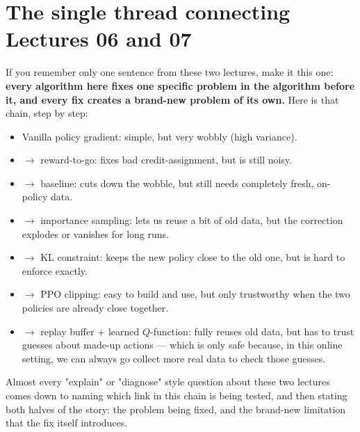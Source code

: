 \documentclass[11pt]{article}
\begin{document}
\section{The single thread connecting Lectures 06 and 07}

If you remember only one sentence from these two lectures, make it this one: \textbf{every algorithm here fixes one specific problem in the algorithm before it, and every fix creates a brand-new problem of its own.} Here is that chain, step by step:
\begin{itemize}[leftmargin=*]
  \item Vanilla policy gradient: simple, but very wobbly (high variance).
  \item $\to$ reward-to-go: fixes bad credit-assignment, but is still noisy.
  \item $\to$ baseline: cuts down the wobble, but still needs completely fresh, on-policy data.
  \item $\to$ importance sampling: lets us reuse a bit of old data, but the correction explodes or vanishes for long runs.
  \item $\to$ KL constraint: keeps the new policy close to the old one, but is hard to enforce exactly.
  \item $\to$ PPO clipping: easy to build and use, but only trustworthy when the two policies are already close together.
  \item $\to$ replay buffer $+$ learned $Q$-function: fully reuses old data, but has to trust guesses about made-up actions --- which is only safe because, in this online setting, we can always go collect more real data to check those guesses.
\end{itemize}
Almost every "explain" or "diagnose" style question about these two lectures comes down to naming which link in this chain is being tested, and then stating both halves of the story: the problem being fixed, and the brand-new limitation that the fix itself introduces.
\end{document}
